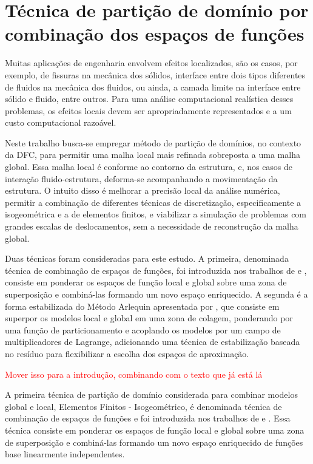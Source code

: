 \chapter[Técnica de partição de domínio por combinação dos espaços de funções]{Técnica de partição de domínio por combinação dos espaços de funções} \label{capitulo:Cap5}

{\color{green} Muitas aplicações de engenharia envolvem efeitos localizados, são os casos, por exemplo, de fissuras na mecânica dos sólidos, interface entre dois tipos diferentes de fluidos na mecânica dos fluidos, ou ainda, a camada limite na interface entre sólido e fluido, entre outros. Para uma análise computacional realística desses problemas, os efeitos locais devem ser apropriadamente representados e a um custo computacional razoável. 

Neste trabalho busca-se empregar método de partição de domínios, no contexto da DFC, para permitir uma malha local mais refinada sobreposta a uma malha global. Essa malha local é conforme ao contorno da estrutura, e, nos casos de interação fluido-estrutura, deforma-se acompanhando a movimentação da estrutura. O intuito disso é melhorar a precisão local da análise numérica, permitir a combinação de diferentes técnicas de discretização, especificamente a isogeométrica e a de elementos finitos, e viabilizar a simulação de problemas com grandes escalas de deslocamentos, sem a necessidade de reconstrução da malha global. 

Duas técnicas foram consideradas para este estudo. A primeira, denominada técnica de combinação de espaços de funções, foi introduzida nos trabalhos de  e , consiste em ponderar os espaços de função local e global sobre uma zona de superposição e combiná-las formando um novo espaço enriquecido. A segunda é a forma estabilizada do Método Arlequin apresentada por , que consiste em superpor os modelos local e global em uma zona de colagem, ponderando por uma função de particionamento e acoplando os modelos por um campo de multiplicadores de Lagrange, adicionando uma técnica de estabilização baseada no resíduo para flexibilizar a escolha dos espaços de aproximação.}\textcolor{red}{Mover isso para a introdução, combinando com o texto que já está lá}

A primeira técnica de partição de domínio considerada para combinar modelos global e local, Elementos Finitos - Isogeométrico, é denominada técnica de combinação de espaços de funções e foi introduzida nos trabalhos de  e . Essa técnica consiste em ponderar os espaços de função local e global sobre uma zona de superposição e combiná-las formando um novo espaço enriquecido de funções base linearmente independentes. 

